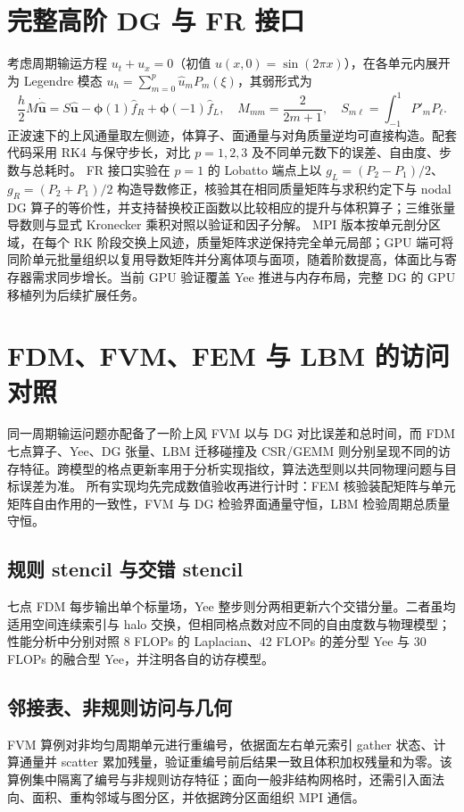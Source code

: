 \section{完整高阶 DG 与 FR 接口}
考虑周期输运方程 $u_t+u_x=0$（初值 $u(x,0)=\sin(2\pi x)$），在各单元内展开为 Legendre 模态 $u_h=\sum_{m=0}^{p}\widehat u_mP_m(\xi)$，其弱形式为
\[
 \frac h2 M\dot{\widehat{\bm u}}
 =S\widehat{\bm u}-\bm\phi(1)\widehat f_R
                         +\bm\phi(-1)\widehat f_L,\quad
 M_{mm}=\frac2{2m+1},\quad S_{m\ell}=\int_{-1}^{1}P'_mP_\ell.
\]
正波速下的上风通量取左侧迹，体算子、面通量与对角质量逆均可直接构造。配套代码采用 RK4 与保守步长，对比 $p=1,2,3$ 及不同单元数下的误差、自由度、步数与总耗时。
FR 接口实验在 $p=1$ 的 Lobatto 端点上以 $g_L=(P_2-P_1)/2$、$g_R=(P_2+P_1)/2$ 构造导数修正，核验其在相同质量矩阵与求积约定下与 nodal DG 算子的等价性，并支持替换校正函数以比较相应的提升与体积算子；三维张量导数则与显式 Kronecker 乘积对照以验证和因子分解。
MPI 版本按单元剖分区域，在每个 RK 阶段交换上风迹，质量矩阵求逆保持完全单元局部；GPU 端可将同阶单元批量组织以复用导数矩阵并分离体项与面项，随着阶数提高，体面比与寄存器需求同步增长。当前 GPU 验证覆盖 Yee 推进与内存布局，完整 DG 的 GPU 移植列为后续扩展任务。
\section{FDM、FVM、FEM 与 LBM 的访问对照}
同一周期输运问题亦配备了一阶上风 FVM 以与 DG 对比误差和总时间，而 FDM 七点算子、Yee、DG 张量、LBM 迁移碰撞及 CSR/GEMM 则分别呈现不同的访存特征。跨模型的格点更新率用于分析实现指纹，算法选型则以共同物理问题与目标误差为准。
所有实现均先完成数值验收再进行计时：FEM 核验装配矩阵与单元矩阵自由作用的一致性，FVM 与 DG 检验界面通量守恒，LBM 检验周期总质量守恒。
\subsection{规则 stencil 与交错 stencil}
七点 FDM 每步输出单个标量场，Yee 整步则分两相更新六个交错分量。二者虽均适用空间连续索引与 halo 交换，但相同格点数对应不同的自由度数与物理模型；性能分析中分别对照 8 FLOPs 的 Laplacian、42 FLOPs 的差分型 Yee 与 30 FLOPs 的融合型 Yee，并注明各自的访存模型。
\subsection{邻接表、非规则访问与几何}
FVM 算例对非均匀周期单元进行重编号，依据面左右单元索引 gather 状态、计算通量并 scatter 累加残量，验证重编号前后结果一致且体积加权残量和为零。该算例集中隔离了编号与非规则访存特征；面向一般非结构网格时，还需引入面法向、面积、重构邻域与图分区，并依据跨分区面组织 MPI 通信。
